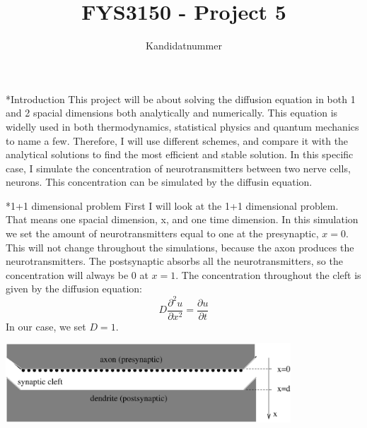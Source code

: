 \documentclass[a4paper, 12pt, titlepage]{article}
\author{Kandidatnummer }
\title{FYS3150 - Project 5}
\newcommand{\beq}{\begin{equation*}}
\newcommand{\eeq}{\end{equation*}}
\newcommand{\pa}{\partial}
\begin{document}
 \maketitle
 \newpage
 
 \begin{section}*{Introduction}
  This project will be about solving the diffusion equation in both 1 and 2 spacial dimensions both 
  analytically and numerically. This equation is widelly used in both thermodynamics, statistical physics and
  quantum mechanics to name a few. Therefore, I will use different schemes, and compare it with the analytical
  solutions to find the most efficient and stable solution. In this specific case, I simulate
  the concentration of neurotransmitters between two nerve cells, neurons. This concentration can be simulated
  by the diffusin equation. 
 \end{section}

 \begin{section}*{1+1 dimensional problem}
  First I will look at the 1+1 dimensional problem. That means one spacial dimension, x, and one time 
  dimension. In this simulation we set the amount of neurotransmitters equal to one at the presynaptic,
  $x=0$. This will not change throughout the simulations, because the axon produces the neurotransmitters.
  The postsynaptic absorbs all the neurotransmitters, so the concentration will always be 0 at $x=1$. 
  The concentration throughout the cleft is given by the diffusion equation:
  \beq D\frac{\pa^2 u}{\pa x^2} = \frac{\pa u}{\pa t} \eeq
  In our case, we set $D=1$. 
 
  \includegraphics[width=0.8\textwidth]{build-main-Desktop-Debug/synaptic_cleft.eps}{\centering}
 
 \end{section} 
 
\end{document}
